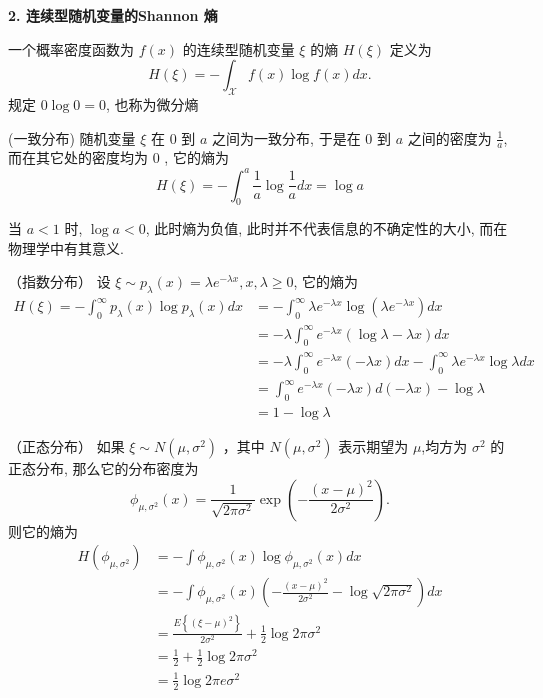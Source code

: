 \textbf{2. 连续型随机变量的Shannon 熵}
\begin{definition}
    一个概率密度函数为 $ f(x) $ 的连续型随机变量 $ \xi $ 的熵 $ H(\xi) $ 定义为
$$
H(\xi)=-\int_{\mathscr{X}} f(x) \log f(x) d x .
$$
规定 $ 0 \log 0=0 $, 也称为微分熵
\end{definition}
\begin{example}
     (一致分布) 随机变量 $ \xi $ 在 0 到 $ a $ 之间为一致分布, 于是在 0 到 $ a $ 之间的密度为 $ \frac{1}{a} $, 而在其它处的密度均为 0 , 它的熵为
$$
H(\xi)=-\int_{0}^{a} \frac{1}{a} \log \frac{1}{a} d x=\log a
$$
\end{example}
\begin{remark}
    当 $ a<1 $ 时, $ \log a<0 $, 此时熵为负值, 此时并不代表信息的不确定性的大小, 而在物理学中有其意义.
\end{remark}
\begin{example}
  （指数分布） 设 $ \xi \sim p_{\lambda}(x)=\lambda e^{-\lambda x}, x, \lambda \geqslant 0 $, 它的熵为
$$
\begin{aligned}
H(\xi)  =-\int_{0}^{\infty} p_{\lambda}(x) \log p_{\lambda}(x) d x  &=-\int_{0}^{\infty} \lambda e^{-\lambda x} \log \left(\lambda e^{-\lambda x}\right) d x \\
& =-\lambda \int_{0}^{\infty} e^{-\lambda x}(\log \lambda-\lambda x) d x \\
& =-\lambda \int_{0}^{\infty} e^{-\lambda x}(-\lambda x) d x-\int_{0}^{\infty} \lambda e^{-\lambda x} \log \lambda d x \\
& =\int_{0}^{\infty} e^{-\lambda x}(-\lambda x) d(-\lambda x)-\log \lambda \\
& =1-\log \lambda
\end{aligned}
$$
\end{example}
\begin{example}
  （正态分布） 如果 $ \xi \sim N\left(\mu, \sigma^{2}\right) $ ，其中 $ N\left(\mu, \sigma^{2}\right) $ 表示期望为 $ \mu $,均方为 $ \sigma^{2} $ 的正态分布, 那么它的分布密度为
$$
\phi_{\mu, \sigma^{2}}(x)=\frac{1}{\sqrt{2 \pi \sigma^{2}}} \exp \left(-\frac{(x-\mu)^{2}}{2 \sigma^{2}}\right) .
$$
则它的熵为
$$
\begin{aligned}
H\left(\phi_{\mu, \sigma^{2}}\right)&=-\int \phi_{\mu, \sigma^{2}}(x) \log \phi_{\mu, \sigma^{2}}(x) d x \\
&=-\int \phi_{\mu, \sigma^{2}}(x)\left(-\frac{(x-\mu)^{2}}{2 \sigma^{2}}-\log \sqrt{2 \pi \sigma^{2}}\right) d x \\
&=\frac{E\left\{(\xi-\mu)^{2}\right\}}{2 \sigma^{2}}+\frac{1}{2} \log 2 \pi \sigma^{2} \\
&=\frac{1}{2}+\frac{1}{2} \log 2 \pi \sigma^{2} \\
&=\frac{1}{2} \log 2 \pi e \sigma^{2}
\end{aligned}
$$
\end{example}

